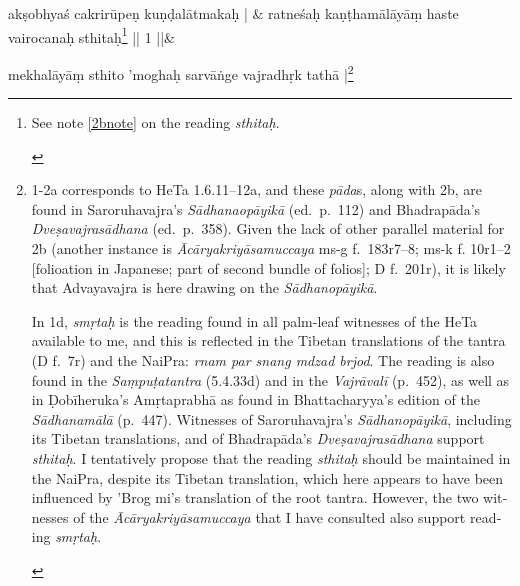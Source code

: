 \documentclass[naipra.tex]{subfiles}
\begin{document}
\begin{sanskrit}

\medskip\versequote
akṣobhyaś cakrirūpeṇ kuṇḍalātmakaḥ | &
ratneśaḥ kaṇṭhamālāyāṃ haste vairocanaḥ sthitaḥ\footnote{
	\begin{english}%
		See note \ref{2bnote} on the reading \emph{sthitaḥ}.
	\end{english}
} || 1 ||\&


\medskip\versequote
mekhalāyāṃ sthito 'moghaḥ sarvāṅge vajradhṛk tathā |\footnote{
	\begin{english}%
		1-2a corresponds to HeTa 1.6.11–12a, and these \emph{pāda}s, along with 2b, are found in Saroruhavajra's \emph{Sādhanaopāyikā} (ed.\ p.\ 112) and Bhadrapāda's \emph{Dveṣavajrasādhana} (ed.\ p.\ 358).
		Given the lack of other parallel material for 2b (another instance is \emph{Ācāryakriyāsamuccaya} ms-g f.\ 183r7–8; ms-k f. 10r1–2 [folioation in Japanese; part of second bundle of folios]; D f.\ 201r), it is likely that Advayavajra is here drawing on the \emph{Sādhanopāyikā}.
	
		In 1d, \emph{smṛtaḥ} is the reading found in all palm-leaf witnesses of the HeTa available to me, and this is reflected in the Tibetan translations of the tantra (D f.\ 7r) and the NaiPra: \emph{rnam par snang mdzad brjod}.
		The reading is also found in the \emph{Saṃpuṭatantra} (5.4.33d) and in the \emph{Vajrāvalī} (p.\ 452), as well as in Ḍobīheruka's {Amṛtaprabhā} as found in Bhattacharyya's edition of the \emph{Sādhanamālā} (p.\ 447).
		Witnesses of Saroruhavajra's \emph{Sādhanopāyikā}, including its Tibetan translations, and of Bhadrapāda's \emph{Dveṣavajrasādhana} support \emph{sthitaḥ}.
		I tentatively propose that the reading \emph{sthitaḥ} should be maintained in the NaiPra, despite its Tibetan translation, which here appears to have been influenced by 'Brog mi's translation of the root tantra.
		However, the two witnesses of the \emph{Ācāryakriyāsamuccaya} that I have consulted also support reading \emph{smṛtaḥ}.


\end{english}}
\end{sanskrit}
\end{document}
